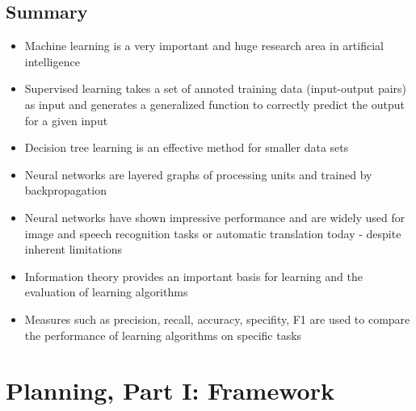 \documentclass[conference]{styles/acmsiggraph}
\begin{document}
    \subsection{Summary}
        \begin{itemize}
            \item Machine learning is a very important and huge research area in artificial intelligence
            \item Supervised learning takes a set of annoted training data (input-output pairs) as input and generates a generalized function to correctly predict the output for a given input
            \item Decision tree learning is an effective method for smaller data sets
            \item Neural networks are layered graphs of processing units and trained by backpropagation
            \item Neural networks have shown impressive performance and are widely used for image and speech recognition tasks or automatic translation today - despite inherent limitations
            \item Information theory provides an important basis for learning and the evaluation of learning algorithms
            \item Measures such as precision, recall, accuracy, specifity, F1 are used to compare the performance of learning algorithms on specific tasks
        \end{itemize}

\newpage


\section{Planning, Part I: Framework}
    
    
        
        
            
            
            
            
    
    
    
    
        
    
                
                
    
    
        
            
            
    

    

    
\end{document}
